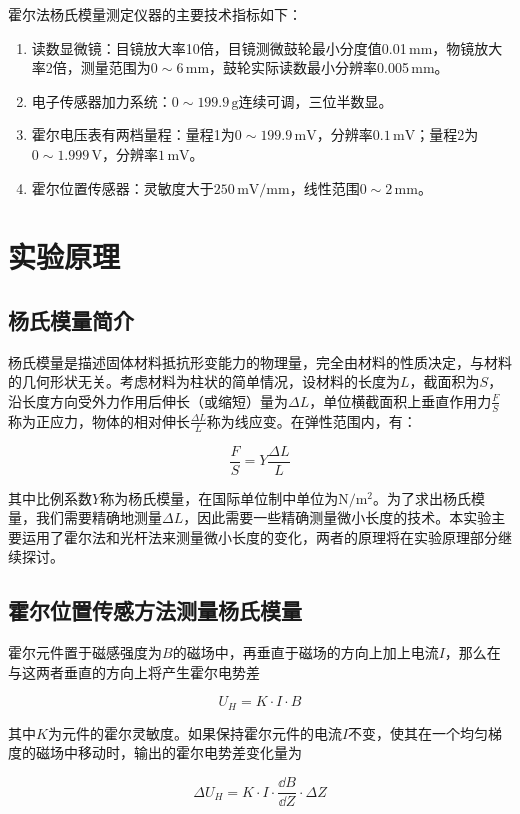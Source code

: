 \documentclass[12pt]{article}
\begin{document}
霍尔法杨氏模量测定仪器的主要技术指标如下：

\begin{enumerate}
    \item 读数显微镜：目镜放大率10倍，目镜测微鼓轮最小分度值0.01\,mm，物镜放大率2倍，测量范围为$ 0\sim 6\,\mathrm{mm} $，鼓轮实际读数最小分辨率0.005\,mm。
    \item 电子传感器加力系统：$ 0\sim 199.9\,\mathrm{g} $连续可调，三位半数显。
    \item 霍尔电压表有两档量程：量程1为$ 0\sim 199.9\,\mathrm{mV} $，分辨率$ 0.1\,\mathrm{mV} $；量程2为$ 0\sim 1.999\,\mathrm{V} $，分辨率$ 1\,\mathrm{mV} $。
    \item 霍尔位置传感器：灵敏度大于$ 250\,\mathrm{mV/mm} $，线性范围$ 0\sim 2\,\mathrm{mm} $。
\end{enumerate}

\section{实验原理}
\subsection{杨氏模量简介}
杨氏模量是描述固体材料抵抗形变能力的物理量，完全由材料的性质决定，与材料的几何形状无关。考虑材料为柱状的简单情况，设材料的长度为$L$，截面积为$S$，沿长度方向受外力作用后伸长（或缩短）量为$\Delta L$，单位横截面积上垂直作用力$\frac{F}{S}$称为正应力，物体的相对伸长$\frac{\Delta L}{L}$称为线应变。在弹性范围内，有：

\[
    \frac{F}{S}=Y\frac{\Delta L}{L}
\]

其中比例系数$Y$称为杨氏模量，在国际单位制中单位为$\mathrm{N/m^2}$。为了求出杨氏模量，我们需要精确地测量$\Delta L$，因此需要一些精确测量微小长度的技术。本实验主要运用了霍尔法和光杆法来测量微小长度的变化，两者的原理将在实验原理部分继续探讨。

\subsection{霍尔位置传感方法测量杨氏模量}\label{subsec:hallprinciple}
霍尔元件置于磁感强度为$ B $的磁场中，再垂直于磁场的方向上加上电流$ I $，那么在与这两者垂直的方向上将产生霍尔电势差

\[
    U_H=K\cdot I\cdot B
\]

其中$K$为元件的霍尔灵敏度。如果保持霍尔元件的电流$ I $不变，使其在一个均匀梯度的磁场中移动时，输出的霍尔电势差变化量为

\[
    \Delta U_H=K\cdot I\cdot\frac{\dd B}{\dd Z}\cdot\Delta Z
\]
\end{document}
